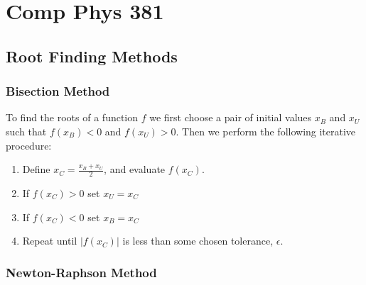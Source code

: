 \documentclass[12pt, a4paper, oneside, openright, titlepage]{book}
\begin{document}
\tableofcontents

\part{Comp Phys 381}

\chapter{Root Finding Methods}



\section{Bisection Method}

\begin{proc}
	To find the roots of a function $f$ we first choose a pair of initial values $x_B$ and $x_U$ such that $f(x_B) < 0$ and $f(x_U) > 0$. Then we perform the following iterative procedure:
	\begin{enumerate}
		\item Define $x_C = \frac{x_B+x_U}{2}$, and evaluate $f(x_C)$.
		\item If $f(x_C) > 0$ set $x_U = x_C$
		\item If $f(x_C) < 0$ set $x_B = x_C$
		\item Repeat until $|f(x_C)|$ is less than some chosen tolerance, $\epsilon$.
	\end{enumerate}
\end{proc}


\section{Newton-Raphson Method}
\end{document}
